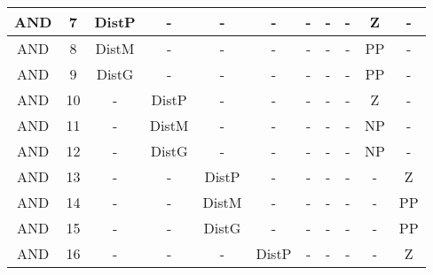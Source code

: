 \begin{table}[ht]
{\begin{tabular}{|c|c|c|c|c|c|c|c|c|c|c|}
AND                                                                             & 7                 & DistP          & -              & -              & -              & -              & -      & -      & Z          & -          \\ \hline
AND                                                                             & 8                 & DistM          & -              & -              & -              & -              & -      & -      & PP         & -          \\ \hline
AND                                                                             & 9                 & DistG          & -              & -              & -              & -              & -      & -      & PP         & -          \\ \hline
AND                                                                             & 10                & -              & DistP          & -              & -              & -              & -      & -      & Z          & -          \\ \hline
AND                                                                             & 11                & -              & DistM          & -              & -              & -              & -      & -      & NP         & -          \\ \hline
AND                                                                             & 12                & -              & DistG          & -              & -              & -              & -      & -      & NP         & -          \\ \hline
AND                                                                             & 13                & -              & -              & DistP          & -              & -              & -      & -      & -          & Z          \\ \hline
AND                                                                             & 14                & -              & -              & DistM          & -              & -              & -      & -      & -          & PP         \\ \hline
AND                                                                             & 15                & -              & -              & DistG          & -              & -              & -      & -      & -          & PP         \\ \hline
AND                                                                             & 16                & -              & -              & -              & DistP          & -              & -      & -      & -          & Z          \\ \hline

\end{tabular}}
\end{table}
